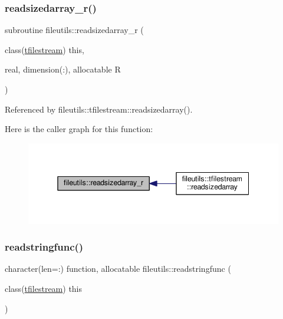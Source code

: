 \subsubsection{\texorpdfstring{readsizedarray\+\_\+r()}{readsizedarray\_r()}}
{\footnotesize\ttfamily subroutine fileutils\+::readsizedarray\+\_\+r (\begin{DoxyParamCaption}\item[{class(\mbox{\hyperlink{structfileutils_1_1tfilestream}{tfilestream}})}]{this,  }\item[{real, dimension(\+:), allocatable}]{R }\end{DoxyParamCaption})\hspace{0.3cm}{\ttfamily [private]}}



Referenced by fileutils\+::tfilestream\+::readsizedarray().

Here is the caller graph for this function\+:
\nopagebreak
\begin{figure}[H]
\begin{center}
\leavevmode
\includegraphics[width=342pt]{namespacefileutils_a9d5d97346bddaa16024b5482cc1ce7cb_icgraph}
\end{center}
\end{figure}
\mbox{\label{namespacefileutils_a8b83c2f06ad952435c760ce789a1b01e}} 
\subsubsection{\texorpdfstring{readstringfunc()}{readstringfunc()}}
{\footnotesize\ttfamily character(len=\+:) function, allocatable fileutils\+::readstringfunc (\begin{DoxyParamCaption}\item[{class(\mbox{\hyperlink{structfileutils_1_1tfilestream}{tfilestream}})}]{this }\end{DoxyParamCaption})\hspace{0.3cm}{\ttfamily [private]}}




